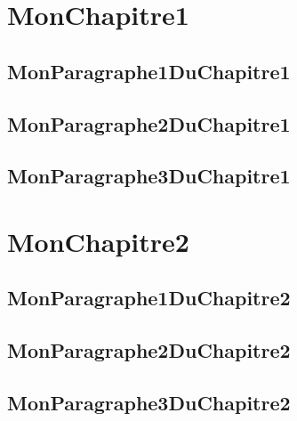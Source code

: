 \documentclass[11pt,twoside]{report}
\begin{document}
\chapter{MonChapitre1}

\section{MonParagraphe1DuChapitre1}

\lipsum[0-2]

\newpage


\section{MonParagraphe2DuChapitre1}

\lipsum[0-2]

\newpage


\section{MonParagraphe3DuChapitre1}

\lipsum[0-2]


\chapter{MonChapitre2}

\section{MonParagraphe1DuChapitre2}

\lipsum[0-2]

\newpage


\section{MonParagraphe2DuChapitre2}

\lipsum[0-2]

\newpage


\section{MonParagraphe3DuChapitre2}

\lipsum[0-2]
\end{document}
